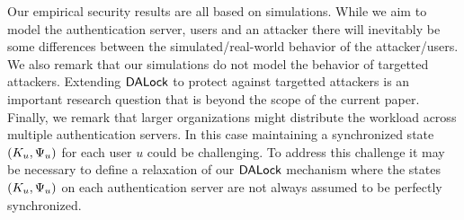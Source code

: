 \label{sec: Limitations}
Our empirical security results are all based on simulations. While we aim to model the authentication server, users and an attacker there will inevitably be some differences between the simulated/real-world behavior of the attacker/users. We also remark that our simulations do not model the behavior of targetted attackers. Extending $\mathsf{DALock}$ to protect against targetted attackers is an important research question that is beyond the scope of the current paper. Finally, we remark that larger organizations might distribute the workload across multiple authentication servers. In this case maintaining a synchronized state $(K_{u}, \Psi_{u})$ for each user $u$ could be challenging. To address this challenge it may be necessary to define a relaxation of our $\mathsf{DALock}$ mechanism where the states $(K_{u}, \Psi_{u})$ on each authentication server are not always assumed to be perfectly synchronized. 





